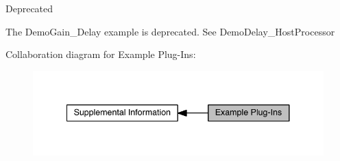 \begin{DoxyRefDesc}{Deprecated}
\item[\hyperlink{a00386__deprecated000001}{Deprecated}]The Demo\+Gain\+\_\+\+Delay example is deprecated. See Demo\+Delay\+\_\+\+Host\+Processor\end{DoxyRefDesc}
Collaboration diagram for Example Plug-\/\+Ins\+:
\nopagebreak
\begin{figure}[H]
\begin{center}
\leavevmode
\includegraphics[width=341pt]{a00376}
\end{center}
\end{figure}
